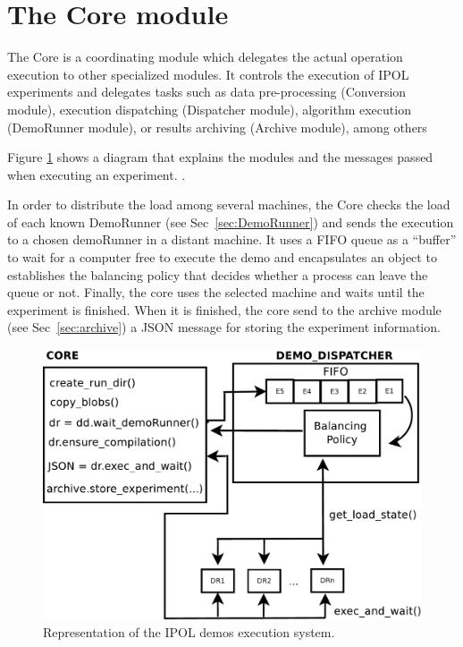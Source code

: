 \section{The Core module}
The Core is a coordinating module which delegates the actual operation execution to other specialized modules. It controls the execution of IPOL experiments and delegates tasks such as data pre-processing (Conversion module), execution dispatching (Dispatcher module), algorithm execution (DemoRunner module), or results archiving (Archive module), among others

Figure \ref{fig:core_diagram} shows a diagram that explains the modules and the messages passed when executing an experiment. .

In order to distribute the load among several machines, the Core checks the load of each known DemoRunner (see Sec~\ref{sec:DemoRunner}) and sends the execution to a chosen demoRunner in a distant machine. It uses a FIFO queue as a ``buffer'' to wait for a computer free to execute the demo and encapsulates an object to establishes the balancing policy that decides whether a process can leave the queue or not. Finally, the core uses the selected machine and waits until the experiment is finished. When it is finished, the core send to the archive module (see Sec~\ref{sec:archive}) a JSON message for storing the experiment information.

\begin{figure}[!ht]
\centering
\includegraphics[width=0.7\columnwidth]{core/images/core_diagram.pdf}
\caption{Representation of the IPOL demos execution system.} 
\label{fig:core_diagram}
\end{figure}


